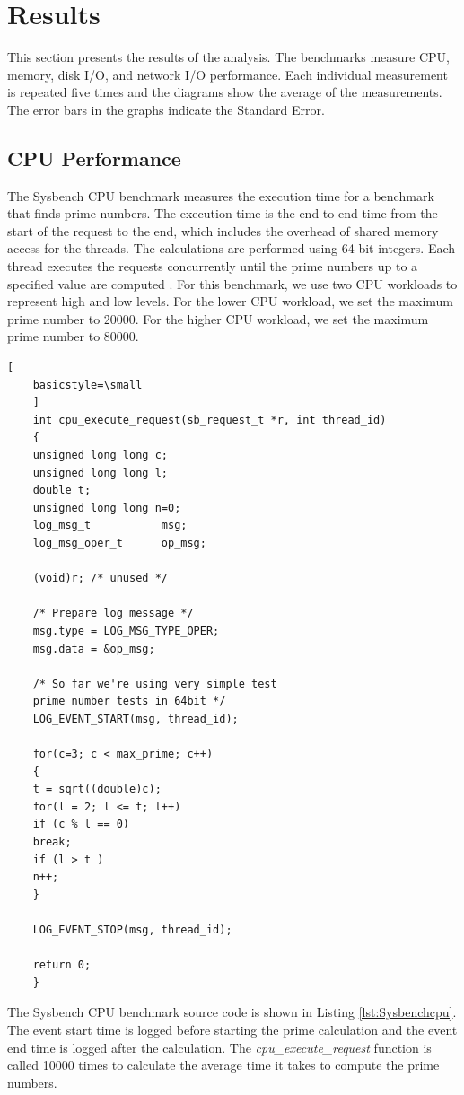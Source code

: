 \documentclass[11pt]{article}
\begin{document}
	\section{Results}
	This section presents the results of the analysis. The benchmarks measure CPU, memory, disk I/O, and network I/O performance. Each individual measurement is repeated five 
	times and the diagrams show the average of the measurements. The error bars in the graphs indicate the
	Standard Error. 
	
	\subsection{CPU Performance}
	The Sysbench CPU benchmark measures the execution time for a benchmark that finds prime numbers. The execution time is the end-to-end time from the start of the request to the end, which includes the overhead of shared memory access for the threads. The calculations are performed using 64-bit integers. Each thread executes the requests concurrently until the prime numbers up to a specified value are computed \cite{kopytov}. For this benchmark, we use two CPU workloads to represent high and low levels. For the lower CPU workload, we set the maximum prime number to 20000. For the higher CPU workload, we set the maximum prime number to 80000. 
	
	\lstset{caption=Sysbench CPU Benchmark Source Code, label=lst:Sysbenchcpu}
	\begin{lstlisting}[
	basicstyle=\small
	]
	int cpu_execute_request(sb_request_t *r, int thread_id)
	{
	unsigned long long c;
	unsigned long long l;
	double t;
	unsigned long long n=0;
	log_msg_t           msg;
	log_msg_oper_t      op_msg;
	
	(void)r; /* unused */
	
	/* Prepare log message */
	msg.type = LOG_MSG_TYPE_OPER;
	msg.data = &op_msg;
	
	/* So far we're using very simple test 
	prime number tests in 64bit */
	LOG_EVENT_START(msg, thread_id);
	
	for(c=3; c < max_prime; c++)  
	{
	t = sqrt((double)c);
	for(l = 2; l <= t; l++)
	if (c % l == 0)
	break;
	if (l > t )
	n++; 
	}
	
	LOG_EVENT_STOP(msg, thread_id);
	
	return 0;
	}
	\end{lstlisting}
	
	The Sysbench CPU benchmark source code is shown in Listing \ref{lst:Sysbenchcpu}. The event start time is logged before starting the prime calculation and the event end time is logged after the calculation. The \textit{cpu\_execute\_request} function is called 10000 times to calculate the average time it takes to compute the prime numbers. 
	
\end{document}
